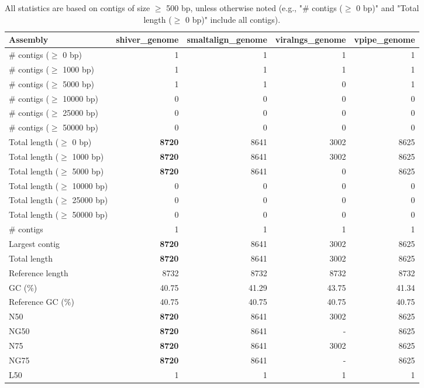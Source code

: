 \documentclass[12pt,a4paper]{article}
\begin{document}
\begin{table}[ht]
\begin{center}
\caption{All statistics are based on contigs of size $\geq$ 500 bp, unless otherwise noted (e.g., "\# contigs ($\geq$ 0 bp)" and "Total length ($\geq$ 0 bp)" include all contigs).}
\begin{tabular}{|l*{4}{|r}|}
\hline
Assembly & shiver\_genome & smaltalign\_genome & viralngs\_genome & vpipe\_genome \\ \hline
\# contigs ($\geq$ 0 bp) & 1 & 1 & 1 & 1 \\ \hline
\# contigs ($\geq$ 1000 bp) & 1 & 1 & 1 & 1 \\ \hline
\# contigs ($\geq$ 5000 bp) & 1 & 1 & 0 & 1 \\ \hline
\# contigs ($\geq$ 10000 bp) & 0 & 0 & 0 & 0 \\ \hline
\# contigs ($\geq$ 25000 bp) & 0 & 0 & 0 & 0 \\ \hline
\# contigs ($\geq$ 50000 bp) & 0 & 0 & 0 & 0 \\ \hline
Total length ($\geq$ 0 bp) & {\bf 8720} & 8641 & 3002 & 8625 \\ \hline
Total length ($\geq$ 1000 bp) & {\bf 8720} & 8641 & 3002 & 8625 \\ \hline
Total length ($\geq$ 5000 bp) & {\bf 8720} & 8641 & 0 & 8625 \\ \hline
Total length ($\geq$ 10000 bp) & 0 & 0 & 0 & 0 \\ \hline
Total length ($\geq$ 25000 bp) & 0 & 0 & 0 & 0 \\ \hline
Total length ($\geq$ 50000 bp) & 0 & 0 & 0 & 0 \\ \hline
\# contigs & 1 & 1 & 1 & 1 \\ \hline
Largest contig & {\bf 8720} & 8641 & 3002 & 8625 \\ \hline
Total length & {\bf 8720} & 8641 & 3002 & 8625 \\ \hline
Reference length & 8732 & 8732 & 8732 & 8732 \\ \hline
GC (\%) & 40.75 & 41.29 & 43.75 & 41.34 \\ \hline
Reference GC (\%) & 40.75 & 40.75 & 40.75 & 40.75 \\ \hline
N50 & {\bf 8720} & 8641 & 3002 & 8625 \\ \hline
NG50 & {\bf 8720} & 8641 & - & 8625 \\ \hline
N75 & {\bf 8720} & 8641 & 3002 & 8625 \\ \hline
NG75 & {\bf 8720} & 8641 & - & 8625 \\ \hline
L50 & 1 & 1 & 1 & 1 \\ \hline

\end{tabular}
\end{center}
\end{table}
\end{document}
